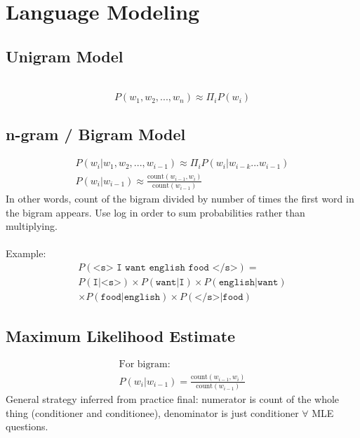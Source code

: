 \documentclass[10pt,twocolumn]{amsart}
\begin{document}
\section{Language Modeling}
\subsection{Unigram Model} \t\\
     \[P(w_1, w_2, ..., w_{n}) \approx \Pi_{i} P(w_i)\]
\subsection{n-gram / Bigram Model}
     \begin{gather*}
     P(w_i | w_1, w_2, ..., w_{i-1}) \approx \Pi_{i} P(w_i|w_{i-k}...w_{i-1}) \\
     P(w_{i}|w_{i-1}) \approx \frac{\text{count}(w_{i-1},
     w_{i})}{\text{count}(w_{i-1})}
     \end{gather*}
  In other words, count of the bigram divided by number of times the first word
  in the bigram appears. Use log in order to sum probabilities rather than 
  multiplying. \\ \\
  Example: 
  \begin{gather*}
  P(\texttt{<s> I want english food </s>}) = \\
            P(\texttt{I|<s>}) \times P(\texttt{want|I}) \times 
            P(\texttt{english|want}) \\
            \times P(\texttt{food|english}) \times P(\texttt{</s>|food})
  \end{gather*}
\subsection{Maximum Likelihood Estimate}
\begin{gather*}
\text{For bigram:}\\
P(w_i|w_{i-1}) = \frac{\text{count}(w_{i-1}, w_i)}
                      {\text{count}(w_{i-1})}
\end{gather*}
General strategy inferred from practice final: numerator is count of the whole thing
(conditioner and conditionee), denominator is just conditioner $\forall$ MLE questions.
\end{document}
